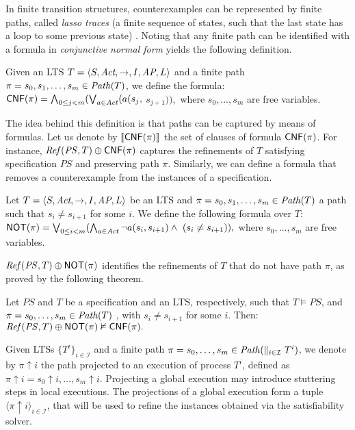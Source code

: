 In finite transition structures, counterexamples can be represented by finite paths, called \emph{lasso traces} (a finite sequence of states, such that the last state has a loop to some previous state) \cite{Biere+1999}.  Noting that any finite path can be identified with a formula in \emph{conjunctive normal form} yields the following definition.

\begin{definition}Given an LTS $T = \langle S, \textit{Act}, \rightarrow, I, \textit{AP}, L \rangle$ and a finite path $\pi = s_0, s_1, \dots ,s_{m} \in \mathit{Path}(T)$, we define the formula:
$
\mathsf{CNF}(\pi) = \bigwedge_{0 \leq j < m}(\bigvee_{a \in \mathit{Act}}(a(s_j,$ $s_{j+1})),
$
where $s_0,\dots,s_m$ are free variables.
\end{definition}

The idea behind this definition is that paths can be captured by means of formulas. Let us denote by  $\llbracket \mathsf{CNF}(\pi) \rrbracket$ the set of clauses of formula $\mathsf{CNF}(\pi)$. For instance, $\mathit{Ref}(\mathit{PS},T) \oplus \mathsf{CNF}(\pi)$ captures the refinements of $T$ satisfying specification $\mathit{PS}$ and preserving path $\pi$. Similarly, we can define a formula that removes a counterexample from the instances of a specification.

\begin{definition}\label{def:not} Let $T = \langle S, \textit{Act}, \rightarrow, I, \textit{AP}, L \rangle$ be an LTS and $\pi = s_0, s_1, \dots, s_m \in \mathit{Path}(T)$ a path such that $s_i \neq s_{i+1}$ for some $i$. We define the following formula over $T$:
$
\mathsf{NOT}(\pi) = \bigvee_{0 \leq i < m} (\bigwedge_{a \in \mathit{Act}} \neg  a(s_{i},s_{i+1})  \wedge \ (s_i \neq s_{i+1})),
$
where $s_0,\dots,s_m$ are free variables.
\end{definition}

$\mathit{Ref}(\mathit{PS},T) \oplus \mathsf{NOT}(\pi)$ identifies the refinements of $T$ that do not have path $\pi$, as proved by the following theorem.

\begin{theorem}\label{theorem:cex-entails} Let $\mathit{PS}$ and $T$ be a specification and an LTS, respectively, such that $T \vDash \mathit{PS}$, and $\pi = s_0,\dots, s_m \in \mathit{Path}(T)$ , with $s_i \neq s_{i+1}$ for some $i$. Then:
$
	\mathit{Ref}(\mathit{PS},T) \oplus \mathsf{NOT}(\pi)  \nvDash \mathsf{CNF}(\pi).
$
\end{theorem}
	
Given LTSs $\{ T^i \}_{i \in \mathcal{I}}$ and a finite path $\pi = s_0, \dots, s_m \in \mathit{Path}(\parallel_{i \in \mathcal{I}} T^i)$, we denote by $\pi {\uparrow} i$ the path projected to an execution of process $T^i$, defined as  $\pi {\uparrow} i = s_0 {\uparrow} i, \dots, s_m {\uparrow} i$. Projecting a global execution may introduce stuttering steps in local executions. The projections of a global execution form a tuple  $\langle \pi{\uparrow}i \rangle_{i \in \mathcal{I}}$, that will be used to refine the instances obtained via the satisfiability solver. 

